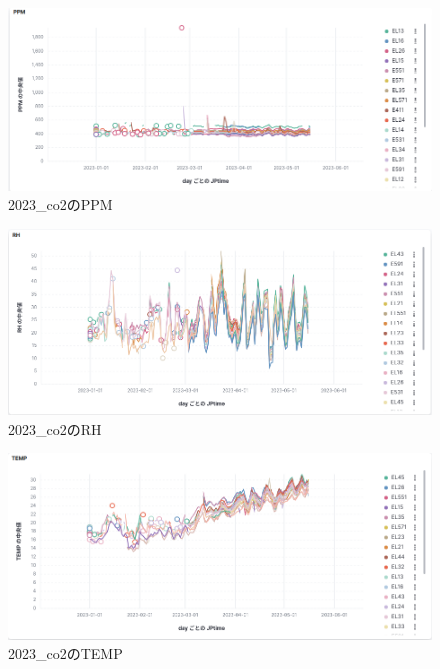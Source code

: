 \begin{figure}[!ht]
    \begin{center}
        \includegraphics[width=160mm]{sotu/figure/2023_ppm.png}
        \caption{2023\_co2のPPM}
        \label{p4}
    \end{center}
\end{figure}

\begin{figure}[!ht]
    \begin{center}
        \includegraphics[width=160mm]{sotu/figure/2023_rh.png}
        \caption{2023\_co2のRH}
        \label{p5}
    \end{center}
\end{figure}

\begin{figure}[!ht]
    \begin{center}
        \includegraphics[width=160mm]{sotu/figure/2023_temp.png}
        \caption{2023\_co2のTEMP}
        \label{p6}
    \end{center}
\end{figure}

